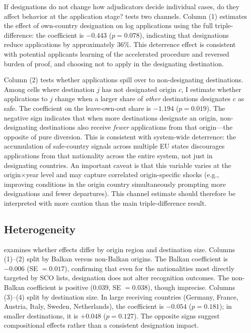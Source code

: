 \documentclass[12pt]{article}
\begin{document}
If designations do not change how adjudicators decide individual cases, do they affect behavior at the application stage?  tests two channels. Column (1) estimates the effect of own-country designation on log applications using the full triple-difference: the coefficient is $-0.443$ ($p = 0.078$), indicating that designations reduce applications by approximately 36\%. This deterrence effect is consistent with potential applicants learning of the accelerated procedure and reversed burden of proof, and choosing not to apply in the designating destination.

Column (2) tests whether applications spill over to non-designating destinations. Among cells where destination $j$ has not designated origin $c$, I estimate whether applications to $j$ change when a larger share of \textit{other} destinations designates $c$ as safe. The coefficient on the leave-own-out share is $-1.194$ ($p = 0.019$). The negative sign indicates that when more destinations designate an origin, non-designating destinations also receive \textit{fewer} applications from that origin---the opposite of pure diversion. This is consistent with system-wide deterrence: the accumulation of safe-country signals across multiple EU states discourages applications from that nationality across the entire system, not just in designating countries. An important caveat is that this variable varies at the origin$\times$year level and may capture correlated origin-specific shocks (e.g., improving conditions in the origin country simultaneously prompting more designations and fewer departures). This channel estimate should therefore be interpreted with more caution than the main triple-difference result.



\subsection{Heterogeneity}

 examines whether effects differ by origin region and destination size. Columns (1)--(2) split by Balkan versus non-Balkan origins. The Balkan coefficient is $-0.006$ (SE $= 0.017$), confirming that even for the nationalities most directly targeted by SCO lists, designation does not alter recognition outcomes. The non-Balkan coefficient is positive (0.039, SE $= 0.038$), though imprecise. Columns (3)--(4) split by destination size. In large receiving countries (Germany, France, Austria, Italy, Sweden, Netherlands), the coefficient is $-0.054$ ($p = 0.181$); in smaller destinations, it is $+0.048$ ($p = 0.127$). The opposite signs suggest compositional effects rather than a consistent designation impact.
\end{document}
